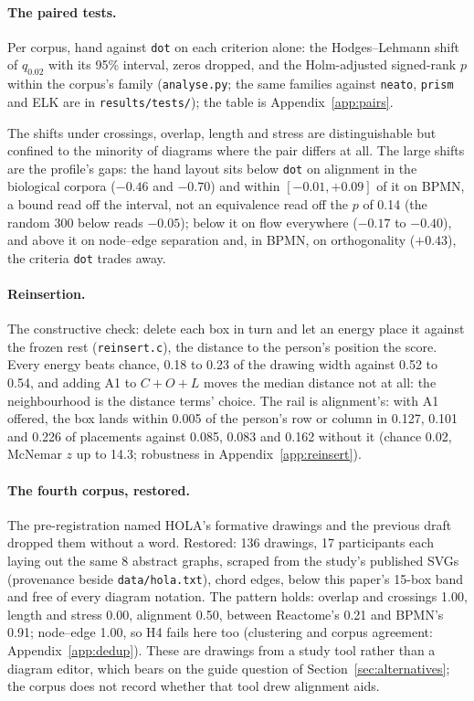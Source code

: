 \documentclass[a4paper,UKenglish]{gd-lipics-v3}
\begin{document}
\paragraph{The paired tests.} Per corpus, hand against \texttt{dot} on each criterion
alone: the Hodges--Lehmann shift of $q_{0.02}$ with its 95\% interval, zeros dropped, and
the Holm-adjusted signed-rank $p$ within the corpus's family
(\texttt{analyse.py}; the same families against \texttt{neato}, \texttt{prism} and ELK
are in \texttt{results/tests/}); the table is Appendix~\ref{app:pairs}.


The shifts under crossings, overlap, length and stress are distinguishable but confined to
the minority of diagrams where the pair differs at all. The large shifts are the profile's
gaps: the hand layout sits below \texttt{dot} on alignment in the biological corpora
($-0.46$ and $-0.70$) and within $[-0.01, +0.09]$ of it on BPMN, a bound read off the
interval, not an equivalence read off the $p$ of 0.14 (the random 300 below reads
$-0.05$); below it on flow everywhere
($-0.17$ to $-0.40$), and above it on node--edge separation and, in BPMN, on
orthogonality ($+0.43$), the criteria \texttt{dot} trades away.


\paragraph{Reinsertion.} The constructive check: delete each box in turn and let an
energy place it against the frozen rest (\texttt{reinsert.c}), the distance to the
person's position the score. Every energy beats chance, 0.18 to 0.23 of the drawing
width against 0.52 to 0.54, and adding A1 to $C{+}O{+}L$ moves the median distance not
at all: the neighbourhood is the distance terms' choice. The rail is alignment's: with
A1 offered, the box lands within 0.005 of the person's row or column in 0.127, 0.101
and 0.226 of placements against 0.085, 0.083 and 0.162 without it (chance 0.02, McNemar
$z$ up to 14.3; robustness in Appendix~\ref{app:reinsert}).

\paragraph{The fourth corpus, restored.} The pre-registration named HOLA's formative
drawings \cite{hola16} and the previous draft dropped them without a word. Restored: 136
drawings, 17 participants each laying out the same 8 abstract graphs, scraped from the
study's published SVGs (provenance beside \texttt{data/hola.txt}), chord edges,
below this paper's 15-box band and free of every diagram notation. The pattern holds:
overlap and crossings 1.00, length and stress 0.00, alignment 0.50, between Reactome's
0.21 and BPMN's 0.91; node--edge 1.00, so H4 fails here too (clustering and corpus
agreement: Appendix~\ref{app:dedup}). These are drawings
from a study tool rather than a diagram editor, which bears on the guide question of
Section~\ref{sec:alternatives}; the corpus does not record whether that tool drew
alignment aids.
\end{document}

